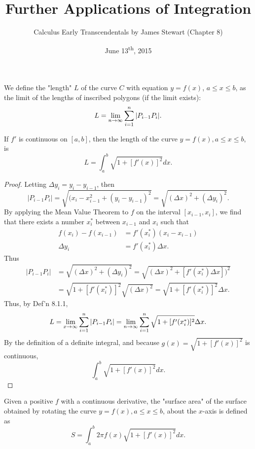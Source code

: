 \documentclass[a4paper,11pt]{article}
\title{Further Applications of Integration}
\author{Calculus Early Transcendentals by James Stewart (Chapter 8)}
\date{June 13\textsuperscript{th}, 2015}
\begin{document}
\maketitle
{}

\begin{outline}

    We define the "length" \(L\) of the curve \(C\) with equation \(y=f(x)\), \(a\leq x\leq b\), as the limit of
    the lengths of inscribed polygons (if the limit exists): \[ L = \lim\limits_{n\rightarrow \infty^{}}\sum_{i=1}^n|P_{i-1}P_i|\text{.} \]
    
    If \(f'\) is continuous on \([a, b]\), then the length of the curve \(y=f(x), a\leq x \leq b\), is
    \[ L = \int_a^b\sqrt{1 + [f'(x)]^2}dx\text{.} \]
    
    \begin{proof}
      Letting \(\Delta{y_i} = y_i - y_{i-1}\), then
      \[ |P_{i-1}P_i| = \sqrt{(x_i-x_{i-1}^2 + (y_i-y_{i-1})^2} = \sqrt{(\Delta{x})^2+(\Delta{y_i})^2}\text{.} \]
      By applying the Mean Value Theorem to \(f\) on the interval \([x_{i-1}, x_i]\), we find that there exists
      a number \(x_i^*\) between \(x_{i-1}\) and \(x_i\) such that
      \begin{align*}
        f(x_i) - f(x_{i-1}) &= f'(x_i^*)(x_i - x_{i-1}) \\
        \Delta{y_i} &= f'(x_i^*)\Delta{x}\text{.}
      \end{align*}
      Thus 
      \begin{align*}
        |P_{i-1}P_i| &= \sqrt{(\Delta{x})^2+(\Delta{y_i})^2} = \sqrt{(\Delta{x})^2+[f'(x_i^*)\Delta{x}])^2} \\
                     &= \sqrt{1 + [f'(x_i^*)]^2}\sqrt{(\Delta{x})^2} = \sqrt{1+[f'(x_i^*)]^2}\Delta{x}\text{.}
      \end{align*}
      Thus, by Def'n 8.1.1, 
      \[ 
        L = \lim\limits_{x\rightarrow \infty^{}}\sum_{i=1}^n|P_{i-1}P_i| 
          = \lim\limits_{n\rightarrow \infty^{}}\sum_{i=1}^n\sqrt{1+[f'(x_i^*)]^2}\Delta{x}\text{.}
      \]
      By the definition of a definite integral, and because \(g(x) = \sqrt{1+[f'(x)]^2}\) is continuous,
      \[ \int_a^b\sqrt{1+[f'(x)]^2}dx\text{.} \]
    \end{proof}
    
    Given a positive \(f\) with a continuous derivative, the "surface area" of the surface obtained by rotating 
    the curve \(y = f(x), a \leq x \leq b\), about the \(x\)-axis is defined as \[ S = \int_a^b2\pi 
    f(x)\sqrt{1+[f'(x)]^2}dx\text{.} \]
    

\end{outline}
\end{document}
